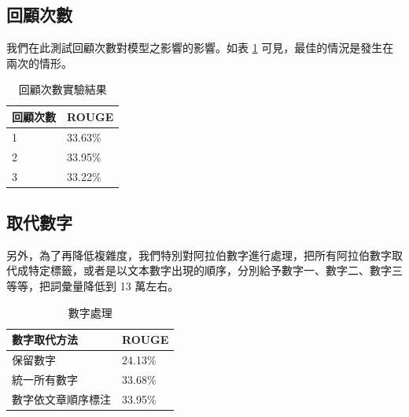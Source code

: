 \subsection{回顧次數}
我們在此測試回顧次數對模型之影響的影響。如表 \ref{table:hop} 可見，最佳的情況是發生在兩次的情形。%
\begin{table}
    \caption{回顧次數實驗結果}
    \label{table:hop}
    \centering
    \begin{tabular}{|l|l|}
        \hline
        回顧次數 & ROUGE\\
        \hline
        1 & 33.63\% \\
        \hline
        2 & 33.95\% \\%
        \hline
        3 & 33.22\% \\
        \hline
    \end{tabular}
\end{table}
\subsection{取代數字}
另外，為了再降低複雜度，我們特別對阿拉伯數字進行處理，把所有阿拉伯數字取代成特定標籤，或者是以文本數字出現的順序，分別給予數字一、數字二、數字三等等，把詞彙量降低到 13 萬左右。
\begin{table}
    \caption{數字處理}
    \label{table:digit}
    \centering
    \begin{tabular}{|l|l|}
        \hline
        數字取代方法 & ROUGE\\
        \hline
        保留數字 & 24.13\% \\%
        \hline
        統一所有數字 & 33.68\% \\
        \hline
        數字依文章順序標注 & 33.95\% \\
        \hline
    \end{tabular}
\end{table}
